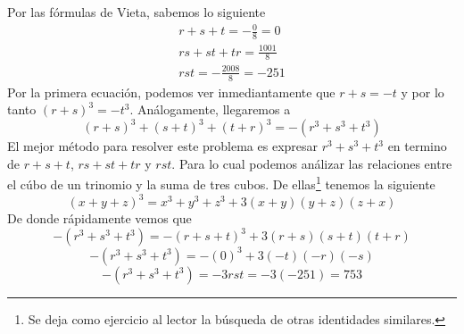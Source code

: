 {\begin{example}[2008 AIME II #7]
        \solution
        {
            Por las fórmulas de Vieta, sabemos lo siguiente
            \begin{gather*}
                r +  s + t = - \frac{0}{8} = 0 \\
                rs +  st + tr = \frac{1001}{8} \\
                r s t = - \frac{2008}{8} = -251
            \end{gather*}
            Por la primera ecuación, podemos ver inmediantamente que $r + s = -t$ y por lo tanto $(r + s)^3 = - t^3$.
            Análogamente, llegaremos a
            \[(r + s)^3 + (s + t)^3 + (t + r)^3 =  -(r^3 + s^3 + t^3)\]
            El mejor método para resolver este problema es expresar $r^3 + s^3 + t^3$ en termino de $r +  s + t$, $rs +  st + tr$ y $r s t$.
            Para lo cual podemos análizar las relaciones entre el cúbo de un trinomio y la suma de tres cubos.
            De ellas\footnote{Se deja como ejercicio al lector la búsqueda de otras identidades similares.} tenemos la siguiente
            \[(x + y + z)^3 = x^3 + y^3 + z^3 + 3(x + y)(y + z)(z + x)\]
            De donde rápidamente vemos que
            \[-(r^3 + s^3 + t^3) = - (r + s + t)^3 + 3(r + s)(s + t)(t + r)\]
            \[-(r^3 + s^3 + t^3) = -(0)^3 + 3(-t)(-r)(-s)\]
            \[-(r^3 + s^3 + t^3) = - 3rst = -3(-251) = \boxed{753}\]
        }
    \end{example}

}\label{sec:desarrollo}

\vspace{-10mm}


